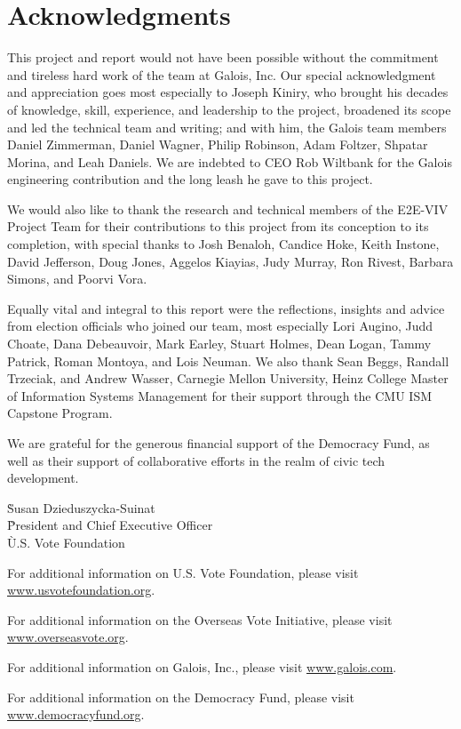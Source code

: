 \chapter*{Acknowledgments}
\label{chapter:acknowledgments}

This project and report would not have been possible without the
commitment and tireless hard work of the team at Galois, Inc. Our
special acknowledgment and appreciation goes most especially to Joseph
Kiniry, who brought his decades of knowledge, skill, experience, and
leadership to the project, broadened its scope and led the technical
team and writing; and with him, the Galois team members Daniel
Zimmerman, Daniel Wagner, Philip Robinson, Adam Foltzer, Shpatar
Morina, and Leah Daniels. We are indebted to CEO Rob Wiltbank for the
Galois engineering contribution and the long leash he gave to this
project.

We would also like to thank the research and technical members of the
E2E-VIV Project Team for their contributions to this project from its
conception to its completion, with special thanks to Josh Benaloh,
Candice Hoke, Keith Instone, David Jefferson, Doug Jones, Aggelos
Kiayias, Judy Murray, Ron Rivest, Barbara Simons, and Poorvi Vora.

Equally vital and integral to this report were the reflections,
insights and advice from election officials who joined our team, most
especially Lori Augino, Judd Choate, Dana Debeauvoir, Mark Earley,
Stuart Holmes, Dean Logan, Tammy Patrick, Roman Montoya, and Lois
Neuman.  We also thank Sean Beggs, Randall Trzeciak, and Andrew
Wasser, Carnegie Mellon University, Heinz College Master of
Information Systems Management for their support through the CMU ISM
Capstone Program.

We are grateful for the generous financial support of the Democracy
Fund, as well as their support of collaborative efforts in the realm
of civic tech development.


\begin{tabbing}
\` Susan Dzieduszycka-Suinat \\
\` President and Chief Executive Officer \\
\` U.S. Vote Foundation
\end{tabbing}

\vspace{\fill}

For additional information on U.S. Vote Foundation, please visit
\url{www.usvotefoundation.org}.   

For additional information on the Overseas Vote Initiative, please
visit \url{www.overseasvote.org}. 

For additional information on Galois, Inc., please visit
\url{www.galois.com}.

For additional information on the Democracy Fund, please visit
\url{www.democracyfund.org}.

